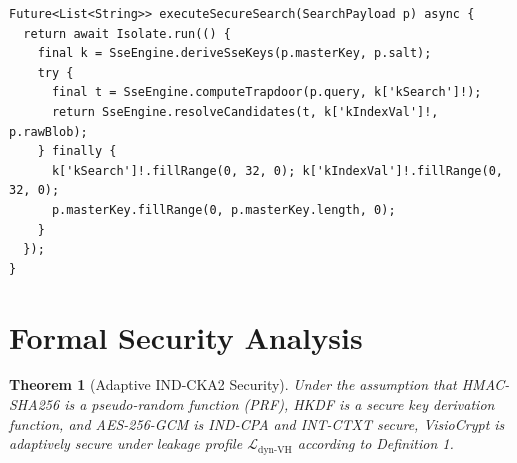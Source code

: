 \documentclass[10pt,conference]{IEEEtran}
\newtheorem{theorem}{Theorem}
\begin{document}
\begin{lstlisting}[style=dartstyle,caption={Isolated Worker Routine with Memory Zeroization},label={lst:isolate}]
Future<List<String>> executeSecureSearch(SearchPayload p) async {
  return await Isolate.run(() {
    final k = SseEngine.deriveSseKeys(p.masterKey, p.salt);
    try {
      final t = SseEngine.computeTrapdoor(p.query, k['kSearch']!);
      return SseEngine.resolveCandidates(t, k['kIndexVal']!, p.rawBlob);
    } finally {
      k['kSearch']!.fillRange(0, 32, 0); k['kIndexVal']!.fillRange(0, 32, 0);
      p.masterKey.fillRange(0, p.masterKey.length, 0);
    }
  });
}
\end{lstlisting}

\section{Formal Security Analysis}
\begin{theorem}[Adaptive IND-CKA2 Security]
Under the assumption that HMAC-SHA256 is a pseudo-random function (PRF), HKDF is a secure key derivation function, and AES-256-GCM is IND-CPA and INT-CTXT secure, VisioCrypt is adaptively secure under leakage profile $\mathcal{L}_{\text{dyn-VH}}$ according to Definition 1.
\end{theorem}
\end{document}
